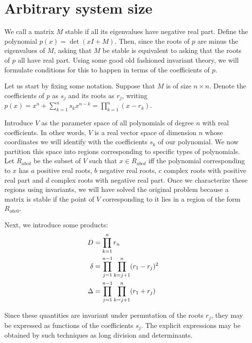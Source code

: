\documentclass{amsart}
\theoremstyle{definition}
\theoremstyle{remark}
\numberwithin{equation}{section}
\begin{document}
\section{Arbitrary system size}
We call a matrix $M$ stable if all its eigenvalues have negative real
part.  Define the polynomial $p(x) = \det(xI + M)$.  Then, since the
roots of $p$ are minus the eigenvalues of $M$, asking that $M$ be
stable is equivalent to asking that the roots of $p$ all have real
part.  Using some good old fashioned invariant theory, we will
formulate conditions for this to happen in terms of the coefficients of
$p$.

Let us start by fixing some notation.  Suppose that $M$ is of size $n
\times n$.  Denote the coefficients of $p$ as $s_j$ and its roots as
$r_j$, writing $p(x) = x^n + \sum_{k=1}^n s_k x^{n-k} = \prod_{k=1}^n
(x-r_k)$.

Introduce $V$ as the parameter space of all polynomials of degree $n$
with real coefficients.  In other words, $V$ is a real vector space of
dimension $n$ whose coordinates we will identify with the coefficients
$s_k$ of our polynomial.  We now partition this space into regions
corresponding to specific types of polynomials.  Let $R_{abcd}$ be the
subset of $V$ such that $x \in R_{abcd}$ iff the polynomial
corresponding to $x$ has $a$ positive real roots, $b$ negative real
roots, $c$ complex roots with positive real part and $d$ complex roots
with negative real part.  Once we characterize these regions using
invariants, we will have solved the original problem because a matrix
is stable if the point of $V$ corresponding to it lies in a region of
the form $R_{a0c0}$.

Next, we introduce some products:
\begin{align}
D &= \prod_{k=1}^n r_n \cr
\delta &= \prod_{j=1}^{n-1} \prod_{k=j+1}^n (r_1 - r_j)^2 \cr
\Delta &= \prod_{j=1}^{n-1} \prod_{k=j+1}^n (r_1 + r_j) \cr
\end{align}

Since these quantities are invariant under permutation of the roots
$r_j$, they may be expressed as functions of the coefficients $s_j$.
The explicit expressions may be obtained by such techniques as long
division and determinants.
\end{document}

